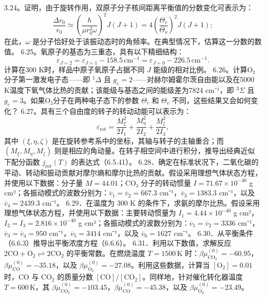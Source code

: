 3.24。证明，由于旋转作用，双原子分子核间距离平衡值的分数变化可表示为：
\begin{equation}\tag{6.6.35}\label{eq:6.6.35}
\frac { \Delta r _ { 0 } } { r _ { 0 } } \simeq \left( \frac { \hbar } { \mu r _ { 0 } ^{2} \omega } \right) ^{2} J ( J + 1 ) = 4 \left( \frac { \Theta _ { r } } { \Theta _ { \nu } } \right) ^{2} J ( J + 1 ) ;
\end{equation}
在此，\(\omega\) 是分子恰好处于该振动态时的角频率。在典型情况下，估算这一分数的数值。
6.25。氧原子的基态为三重态，具有以下精细结构：
\begin{equation}\tag{6.6.36}\label{eq:6.6.36}
\varepsilon _ { J = 2 } = \varepsilon _ { J = 1 } - 15 8 . 5 \, \mathrm { c m } ^{- 1} = \varepsilon _ { J = 0 } - 22 6 . 5 \, \mathrm { c m } ^{- 1} .
\end{equation}
计算在300 K时，样品中原子氧原子占据不同 \(J\) 能级的相对比例。
6.26。计算O₂分子第一激发电子态——即 \(^{1}\Delta\) 且 \(g_{e}=2\)——对赫尔姆霍尔茨自由能以及在5000 K温度下氧气体比热的贡献；该能级与基态之间的能级差为7824 cm⁻¹，即 \(^{3}\Sigma\) 且 \(g_{e}=3\)。如果O₂分子在两种电子态下的参数 \(\Theta_{r}\) 和 \(\Theta_{v}\) 不同，这些结果又会如何变化？
6.27。具有三个自由度的转子的转动动能可以表示为：
\begin{equation}\tag{6.6.37}\label{eq:6.6.37}
\varepsilon _ { \mathrm { r o t } } = \frac { M _ { \xi } ^{2} } { 2 I _ { 1 } } + \frac { M _ { \eta } ^{2} } { 2 I _ { 2 } } + \frac { M _ { \zeta } ^{2} } { 2 I _ { 3 } } ,
\end{equation}
其中 \((\xi,\eta,\zeta)\) 是在旋转参考系中的坐标，其轴与转子的主轴重合；而 \((M_{\xi},M_{\eta},M_{\zeta})\) 则是相应的角动量。在转子相空间中进行积分，推导出经典近似下配分函数 \(j_{\mathrm{rot}}(T)\) 的表达式（6.5.41）。
6.28．确定在标准状况下，二氧化碳的平动、转动和振动贡献对摩尔熵和摩尔比热的贡献。假设采用理想气体状态方程，并使用以下数据：分子量 \(M = 44.01\)；CO₂ 分子的转动惯量 \(I = 71.67 \times 10^{-40}\) g cm²；各振动模式的波数分别为：\(\overline{v}_1 = \overline{v}_2 = 667.3\) cm⁻¹，\(\overline{v}_3 = 1383.3\) cm⁻¹，以及 \(\overline{v}_4 = 2439.3\) cm⁻¹。
6.29．在温度为 300 K 的条件下，求氨的摩尔比热。假设采用理想气体状态方程，并使用以下数据：主要转动惯量为 \(I_{1} = 4.44 \times 10^{-40}\) g cm²，\(I_{2} = I_{3} = 2.816 \times 10^{-40}\) g cm²；各振动模式的波数分别为：\(\overline{v}_{1} = \overline{v}_{2} = 3336\) cm⁻¹，\(\overline{v}_{3} = \overline{v}_{4} = 950\) cm⁻¹，\(\overline{v}_{5} = 3414\) cm⁻¹，以及 \(\overline{v}_{6} = 1627\) cm⁻¹。
6.30．从平衡条件（6.6.3）推导出平衡浓度方程（6.6.6）。
6.31．利用以下数值，求解反应 \(2\mathrm{CO}+\mathrm{O}_{2}\rightleftharpoons2\mathrm{CO}_{2}\) 的平衡常数。在燃烧温度 \(T=1500\,\mathrm{K}\) 时：\(\beta\mu_{\mathrm{CO}_{2}}^{(0)}=-60.95\)，\(\beta\mu_{\mathrm{CO}}^{(0)}=-35.18\)，以及 \(\beta\mu_{\mathrm{O}_{2}}^{(0)}=-27.08\)。利用这些数据，计算当 \([\mathrm{O}_{2}] = 0.01\) 时，\(\mathrm{CO}\) 与 \(\mathrm{CO}_{2}\) 的质量分数 \([\mathrm{CO}]/[\mathrm{CO}_{2}]\)。同样地，针对催化转化器温度 \(T=600\,\mathrm{K}\)，其 \(\beta\mu_{\mathrm{CO}_{2}}^{(0)}=-103.45\)，\(\beta\mu_{\mathrm{CO}}^{(0)}=-45.38\)，以及 \(\beta\mu_{\mathrm{O}_{2}}^{(0)}=-23.49\)。
